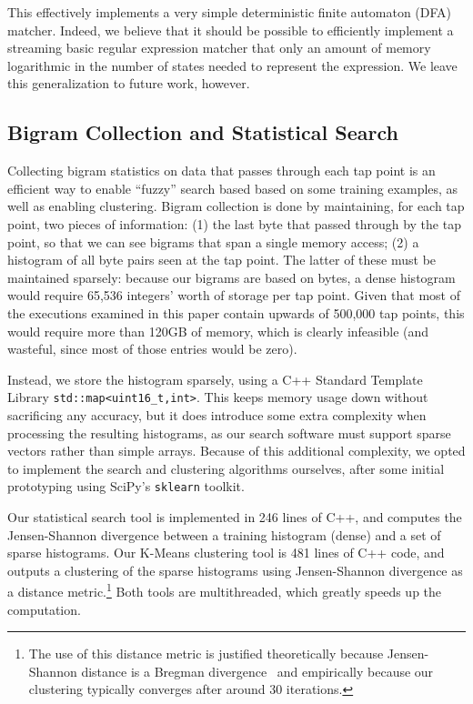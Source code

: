 This effectively implements a very simple deterministic finite automaton
(DFA) matcher. Indeed, we believe that it should be possible to
efficiently implement a streaming basic regular expression matcher that
only an amount of memory logarithmic in the number of states needed to
represent the expression. We leave this generalization to future work,
however.

\subsection{Bigram Collection and Statistical Search}
\label{sec:implementation:subsec:bigram}

Collecting bigram statistics on data that passes through each tap point
is an efficient way to enable ``fuzzy'' search based based on some
training examples, as well as enabling clustering. Bigram collection is
done by maintaining, for each tap point, two pieces of information: (1)
the last byte that passed through by the tap point, so that we can see
bigrams that span a single memory access; (2) a histogram of all byte
pairs seen at the tap point. The latter of these must be maintained
sparsely: because our bigrams are based on bytes, a dense histogram
would require 65,536 integers' worth of storage per tap point. Given
that most of the executions examined in this paper contain upwards of
500,000 tap points, this would require more than 120GB of memory, which
is clearly infeasible (and wasteful, since most of those entries would
be zero).

Instead, we store the histogram sparsely, using a C++ Standard Template
Library \texttt{std::map<uint16\_t,int>}. This keeps memory usage down
without sacrificing any accuracy, but it does introduce some extra
complexity when processing the resulting histograms, as our search
software must support sparse vectors rather than simple arrays. Because
of this additional complexity, we opted to implement the search and
clustering algorithms ourselves, after some initial prototyping using
SciPy's \texttt{sklearn} toolkit.

Our statistical search tool is implemented in 246 lines of C++, and
computes the Jensen-Shannon divergence between a training histogram
(dense) and a set of sparse histograms. Our K-Means clustering tool is
481 lines of C++ code, and outputs a clustering of the sparse histograms
using Jensen-Shannon divergence as a distance metric.\footnote{The use
of this distance metric is justified theoretically because
Jensen-Shannon distance is a Bregman divergence~\cite{Banerjee:2005qf}
and empirically because our clustering typically converges after around
30 iterations.} Both tools are multithreaded, which greatly speeds up the
computation.
